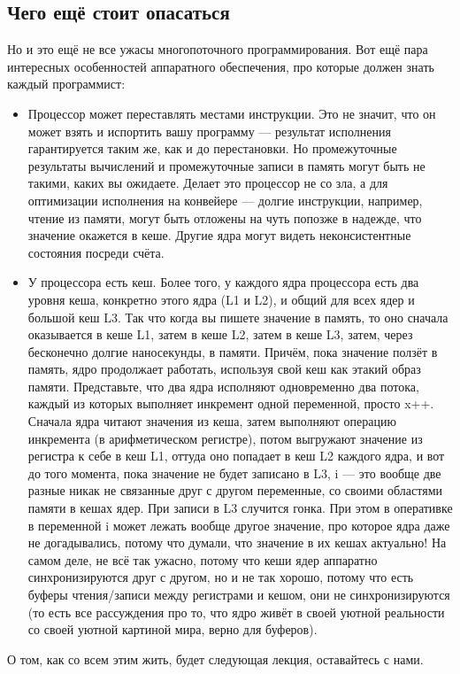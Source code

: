 \documentclass[a5paper]{article}
\begin{document}
\subsection{Чего ещё стоит опасаться}

Но и это ещё не все ужасы многопоточного программирования. Вот ещё пара интересных особенностей аппаратного обеспечения, про которые должен знать каждый программист:

\begin{itemize}
    \item Процессор может переставлять местами инструкции. Это не значит, что он может взять и испортить вашу программу --- результат исполнения гарантируется таким же, как и до перестановки. Но промежуточные результаты вычислений и промежуточные записи в память могут быть не такими, каких вы ожидаете. Делает это процессор не со зла, а для оптимизации исполнения на конвейере --- долгие инструкции, например, чтение из памяти, могут быть отложены на чуть попозже в надежде, что значение окажется в кеше. Другие ядра могут видеть неконсистентные состояния посреди счёта.
    \item У процессора есть кеш. Более того, у каждого ядра процессора есть два уровня кеша, конкретно этого ядра (L1 и L2), и общий для всех ядер и большой кеш L3. Так что когда вы пишете значение в память, то оно сначала оказывается в кеше L1, затем в кеше L2, затем в кеше L3, затем, через бесконечно долгие наносекунды, в памяти. Причём, пока значение ползёт в память, ядро продолжает работать, используя свой кеш как этакий образ памяти. Представьте, что два ядра исполняют одновременно два потока, каждый из которых выполняет инкремент одной переменной, просто x++. Сначала ядра читают значения из кеша, затем выполняют операцию инкремента (в арифметическом регистре), потом выгружают значение из регистра к себе в кеш L1, оттуда оно попадает в кеш L2 каждого ядра, и вот до того момента, пока значение не будет записано в L3, i --- это вообще две разные никак не связанные друг с другом переменные, со своими областями памяти в кешах ядер. При записи в L3 случится гонка. При этом в оперативке в переменной i может лежать вообще другое значение, про которое ядра даже не догадывались, потому что думали, что значение в их кешах актуально! На самом деле, не всё так ужасно, потому что кеши ядер аппаратно синхронизируются друг с другом, но и не так хорошо, потому что есть буферы чтения/записи между регистрами и кешом, они не синхронизируются (то есть все рассуждения про то, что ядро живёт в своей уютной реальности со своей уютной картиной мира, верно для буферов).
\end{itemize}

О том, как со всем этим жить, будет следующая лекция, оставайтесь с нами.
\end{document}
